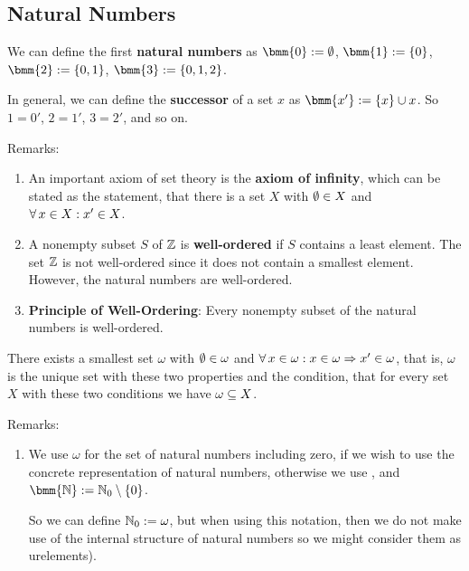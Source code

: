 \documentclass[12pt]{book}
\begin{document}
\subsection{Natural Numbers}
\label{sec:natnumbers}

\begin{defi}\label{def:natnumberssimple}
      We can define the first \textbf{natural numbers} as $\bmm{0} := \es$, $\bmm{1} := \set{0}$, $\bmm{2} := \set{0,1}$, $\bmm{3} := \set{0,1,2}$.
\end{defi}
	  \begin{defi}\label{def:successor}
      In general, we can define the \textbf{successor} of a set $x$ as $\bmm{x'} := \set{x} \cup x$. So $1 = 0'$, $2 = 1'$, $3 = 2'$, and so on.
\end{defi}
Remarks:
\begin{enumerate}
      \item An important axiom of set theory is the \textbf{axiom of infinity}, which can be stated as the statement, that there is a set $X$ with
	  $\emptyset \in X$ and $\forall\, x \in X : x' \in X$.
	  \item A nonempty subset $S$ of $\mathbb{Z}$ is  \textbf{well-ordered} if $S$ contains a least element. The set $\mathbb{Z}$ is not well-ordered since it does not 
	  contain a smallest element. However, the natural numbers are well-ordered.
	  \item \textbf{Principle of Well-Ordering}: Every nonempty subset of the natural numbers is well-ordered.
\end{enumerate}

\begin{lem}\label{lem:omega}
      There exists a smallest set $\omega$ with $\emptyset \in \omega$ and $\forall\, x \in \omega : x \in \omega \Rightarrow x' \in \omega$, that is, $\omega$ is 
	  the unique set with these two properties and the condition, that for every set $X$ with these two conditions we have $\omega \subseteq X$.
\end{lem}
Remarks:
\begin{enumerate}
      \item We use $\omega$ for the set of natural numbers including zero, if we wish to use the concrete representation of natural numbers, otherwise 
	  we use \bmm{\NNZ}, and $\bmm{\NN} := \NNZ \sm \set{0}$.

      So we can define $\mathbb{N}_0 := \omega$, but when using this notation, then we do not make use of the internal structure of natural numbers 
	  so we might consider them as urelements).
\end{enumerate}
\end{document}
